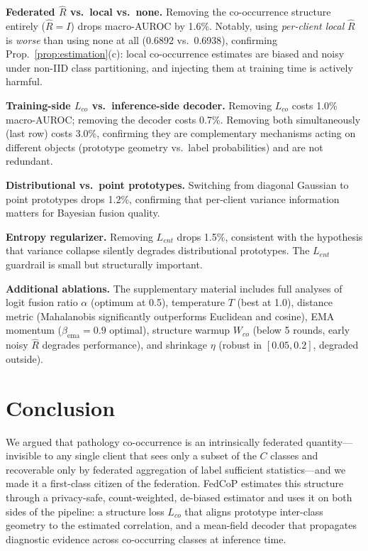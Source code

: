 \documentclass[conference]{IEEEtran}
\theoremstyle{definition}
\newcommand{\Rhat}{\widehat{R}}
\begin{document}
\noindent\textbf{Federated $\Rhat$ vs.\ local vs.\ none.} Removing the co-occurrence structure entirely ($\Rhat{=}I$) drops macro-AUROC by 1.6\%. Notably, using \emph{per-client local} $\Rhat$ is \emph{worse} than using none at all (0.6892 vs.\ 0.6938), confirming Prop.~\ref{prop:estimation}(c): local co-occurrence estimates are biased and noisy under non-IID class partitioning, and injecting them at training time is actively harmful.

\noindent\textbf{Training-side $L_{co}$ vs.\ inference-side decoder.} Removing $L_{co}$ costs 1.0\% macro-AUROC; removing the decoder costs 0.7\%. Removing both simultaneously (last row) costs 3.0\%, confirming they are complementary mechanisms acting on different objects (prototype geometry vs.\ label probabilities) and are not redundant.

\noindent\textbf{Distributional vs.\ point prototypes.} Switching from diagonal Gaussian to point prototypes drops 1.2\%, confirming that per-client variance information matters for Bayesian fusion quality.

\noindent\textbf{Entropy regularizer.} Removing $L_{ent}$ drops 1.5\%, consistent with the hypothesis that variance collapse silently degrades distributional prototypes. The $L_{ent}$ guardrail is small but structurally important.

\noindent\textbf{Additional ablations.} The supplementary material includes full analyses of logit fusion ratio $\alpha$ (optimum at 0.5), temperature $T$ (best at 1.0), distance metric (Mahalanobis significantly outperforms Euclidean and cosine), EMA momentum ($\beta_{\text{ema}}{=}0.9$ optimal), structure warmup $W_{co}$ (below 5 rounds, early noisy $\Rhat$ degrades performance), and shrinkage $\eta$ (robust in $[0.05, 0.2]$, degraded outside).

\section{Conclusion}

We argued that pathology co-occurrence is an intrinsically federated quantity---invisible to any single client that sees only a subset of the $C$ classes and recoverable only by federated aggregation of label sufficient statistics---and we made it a first-class citizen of the federation. FedCoP estimates this structure through a privacy-safe, count-weighted, de-biased estimator and uses it on both sides of the pipeline: a structure loss $L_{co}$ that aligns prototype inter-class geometry to the estimated correlation, and a mean-field decoder that propagates diagnostic evidence across co-occurring classes at inference time.
\end{document}
